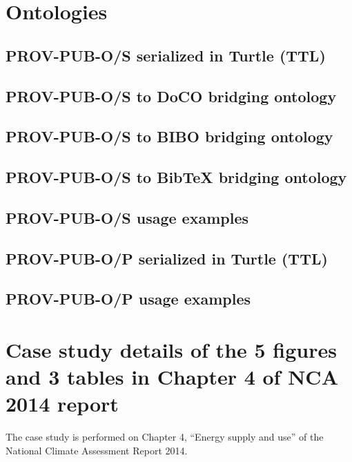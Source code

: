  
\appendix    %

\chapter{Ontologies}
\section{PROV-PUB-O/S serialized in Turtle (TTL)}

\section{PROV-PUB-O/S to DoCO bridging ontology}

\section{PROV-PUB-O/S to BIBO bridging ontology}

\section{PROV-PUB-O/S to BibTeX bridging ontology}

\section{PROV-PUB-O/S usage examples}

\section{PROV-PUB-O/P serialized in Turtle (TTL)}

\section{PROV-PUB-O/P usage examples}


\chapter{Case study details of the 5 figures and 3 tables in Chapter 4 of NCA 2014 report}
The case study is performed on Chapter 4, ``Energy supply and use'' of the National Climate Assessment Report 2014.

